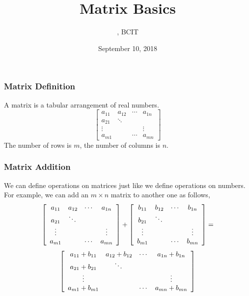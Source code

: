 \documentclass[xcolor=dvipsnames]{beamer}
\title{Matrix Basics}
\subtitle{{\CourseNumber}, BCIT}
\author{\CourseName}
\date{September 10, 2018}
\begin{document}
\begin{frame}
  \titlepage
\end{frame}

\begin{frame}
  \frametitle{Matrix Definition}
  A matrix is a tabular arrangement of real numbers. 
  \begin{equation}
    \label{eq:oathaemo}
    \left[\begin{array}{cccc}
    a_{11}&a_{12}&\cdots{}&a_{1n} \\
          a_{21}&\ddots{}&& \\
          \vdots{}&&&\vdots \\
          a_{m1}&&\cdots{}&a_{mn}
  \end{array}\right]
\end{equation}
The number of rows is $m$, the number of columns is $n$. 
\end{frame}

\begin{frame}
  \frametitle{Matrix Addition}
We can define operations on matrices just like we define operations on
numbers. For example, we can add an $m\times{}n$ matrix to another one
as follows,
\begin{equation}
  \label{eq:ahloongi}
  \left[\begin{array}{cccc}
    a_{11}&a_{12}&\cdots{}&a_{1n} \\
          a_{21}&\ddots{}&& \\
          \vdots{}&&&\vdots \\
          a_{m1}&&\cdots{}&a_{mn}
  \end{array}\right]+\left[
\begin{array}{cccc}
    b_{11}&b_{12}&\cdots{}&b_{1n} \\
          b_{21}&\ddots{}&& \\
          \vdots{}&&&\vdots \\
          b_{m1}&&\cdots{}&b_{mn}
  \end{array}\right]=\notag
\end{equation}
\begin{equation}
  \label{eq:fohghoaw}
\left[
\begin{array}{cccc}
    a_{11}+b_{11}&a_{12}+b_{12}&\cdots{}&a_{1n}+b_{1n} \\
          a_{21}+b_{21}&\ddots{}&& \\
          \vdots{}&&&\vdots \\
          a_{m1}+b_{m1}&&\cdots{}&a_{mn}+b_{mn}
  \end{array}\right]\notag
\end{equation}
\end{frame}
\end{document}
